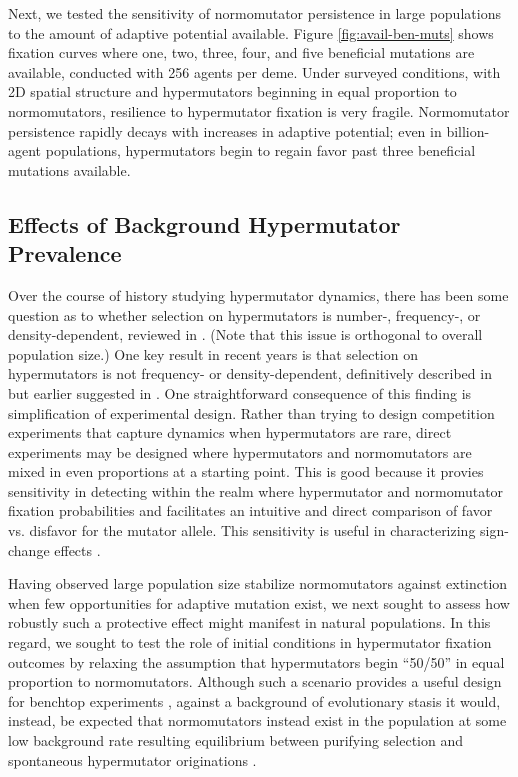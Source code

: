 

Next, we tested the sensitivity of normomutator persistence in large populations to the amount of adaptive potential available.
Figure \ref{fig:avail-ben-muts} shows fixation curves where one, two, three, four, and five beneficial mutations are available, conducted with 256 agents per deme.
Under surveyed conditions, with 2D spatial structure and hypermutators beginning in equal proportion to normomutators, resilience to hypermutator fixation is very fragile.
Normomutator persistence rapidly decays with increases in adaptive potential;
even in billion-agent populations, hypermutators begin to regain favor past three beneficial mutations available.



\subsection{Effects of Background Hypermutator Prevalence}
\label{sec:background-hypermutator-prevalence}

Over the course of history studying hypermutator dynamics, there has been some question as to whether selection on hypermutators is number-, frequency-, or density-dependent, reviewed in \citep{raynes2019selection}.
(Note that this issue is orthogonal to overall population size.)
One key result in recent years is that selection on hypermutators is not frequency- or density-dependent, definitively described in \citep{raynes2019selection} but earlier suggested in \citep{wylie2009fixation}.
One straightforward consequence of this finding is simplification of experimental design.
Rather than trying to design competition experiments that capture dynamics when hypermutators are rare, direct experiments may be designed where hypermutators and normomutators are mixed in even proportions at a starting point.
This is good because it provies sensitivity in detecting within the realm where hypermutator and normomutator fixation probabilities and facilitates an intuitive and direct comparison of favor vs. disfavor for the mutator allele.
This sensitivity is useful in characterizing sign-change effects \citep{raynes2018selection}.



Having observed large population size stabilize normomutators against extinction when few opportunities for adaptive mutation exist, we next sought to assess how robustly such a protective effect might manifest in natural populations.
In this regard, we sought to test the role of initial conditions in hypermutator fixation outcomes by relaxing the assumption that hypermutators begin ``50/50'' in equal proportion to normomutators.
Although such a scenario provides a useful design for benchtop experiments \citep{raynes2018sign}, against a background of evolutionary stasis it would, instead, be expected that normomutators instead exist in the population at some low background rate resulting equilibrium between purifying selection and spontaneous hypermutator originations \citep{desai2011balance,johnson1999approach}.


